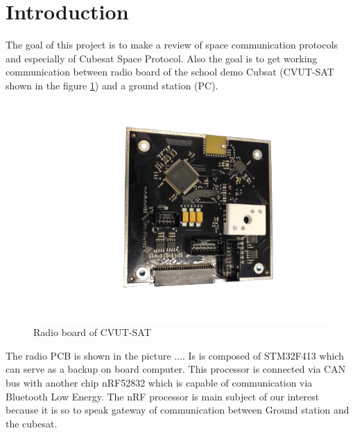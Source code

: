 \documentclass[conference]{IEEEtran}
\begin{document}
\section{Introduction}
The goal of this project is to make a review of space communication protocols and especially of Cubesat Space Protocol. Also the goal is to get working communication between radio board of the school demo Cubsat (CVUT-SAT\cite{CVUT-SAT} shown in the figure \ref{cvut-sat}) and a ground station (PC).

\begin{figure}[htbp]
	\centerline{\includegraphics[scale=0.4]{images/radio-pcb}}
	\caption{Radio board of CVUT-SAT}
	\label{cvut-sat}
\end{figure}

The radio PCB is shown in the picture .... Is is composed of STM32F413 which can serve as a backup on board computer. This processor is connected via CAN bus with another chip nRF52832 which is capable of communication via Bluetooth Low Energy. The nRF processor is main subject of our interest because it is so to speak gateway of communication between Ground station and the cubesat.
\end{document}
